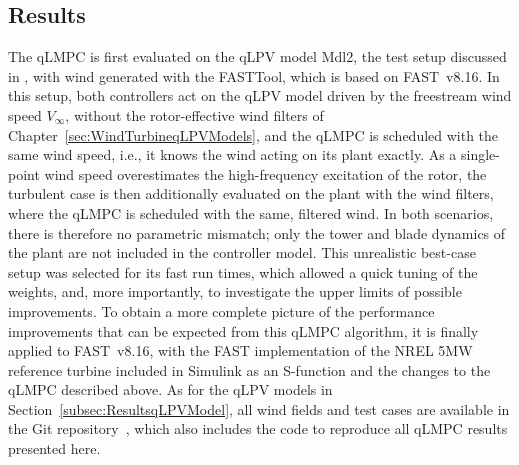 \subsection{Results} \label{quasiLPVMPCResults}
The qLMPC is first evaluated on the qLPV model Mdl2, the test setup discussed in \cite{dittmer2021velocity}, with wind generated with the FASTTool, which is based on FAST~v8.16. In this setup, both controllers act on the qLPV model driven by the freestream wind speed $V_\infty$, without the rotor-effective wind filters of Chapter~\ref{sec:WindTurbineqLPVModels}, and the qLMPC is scheduled with the same wind speed, i.e., it knows the wind acting on its plant exactly. As a single-point wind speed overestimates the high-frequency excitation of the rotor, the turbulent case is then additionally evaluated on the plant with the wind filters, where the qLMPC is scheduled with the same, filtered wind. In both scenarios, there is therefore no parametric mismatch; only the tower and blade dynamics of the plant are not included in the controller model. This unrealistic best-case setup was selected for its fast run times, which allowed a quick tuning of the weights, and, more importantly, to investigate the upper limits of possible improvements. To obtain a more complete picture of the performance improvements that can be expected from this qLMPC algorithm, it is finally applied to FAST~v8.16, with the FAST implementation of the NREL 5MW reference turbine included in Simulink as an S-function and the changes to the qLMPC described above. As for the qLPV models in Section~\ref{subsec:ResultsqLPVModel}, all wind fields and test cases are available in the Git repository~\cite{GitRepoCodeqLMPC}, which also includes the code to reproduce all qLMPC results presented here.

